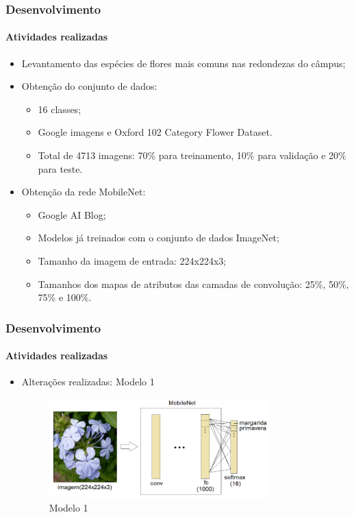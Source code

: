 \documentclass{beamer}
\begin{document}
    
    \begin{frame}
      \frametitle{Desenvolvimento}
      \framesubtitle{Atividades realizadas}      
      \begin{itemize}
        \item<1-> Levantamento das espécies de flores mais comuns nas redondezas do câmpus;\medskip
	    \item<2-> Obtenção do conjunto de dados:
	    		\begin{itemize}
	    			\item<3-> 16 classes;
	    			\item<4-> Google imagens e Oxford 102 Category Flower Dataset.
	    			\item<5-> Total de 4713 imagens: 70\% para treinamento, 10\% para validação e 20\% para teste. \medskip
	    		\end{itemize}
        \item<3-> Obtenção da rede MobileNet: 
        		\begin{itemize}
	    			\item<6-> Google AI Blog;
	    			\item<6-> Modelos já treinados com o conjunto de dados ImageNet; 
				\item<7-> Tamanho da imagem de entrada: 224x224x3;
				\item<7-> Tamanhos dos mapas de atributos das camadas de convolução: 25\%, 50\%, 75\% e 100\%.\medskip    		
	    		\end{itemize}     
      \end{itemize}
    \end{frame}
    
     \begin{frame}
      \frametitle{Desenvolvimento}
      \framesubtitle{Atividades realizadas}      
      \begin{itemize}
        \item<1-> Alterações realizadas: Modelo 1
        		 \begin{figure}[hbt]
      		 	\begin{center}
      				\includegraphics[width=0.8\textwidth]{img/model1.png}
      			\end{center}
      			\caption{Modelo 1~\cite{computer-1209641}}
      		\end{figure}
      \end{itemize}
    \end{frame}
    
\end{document}
